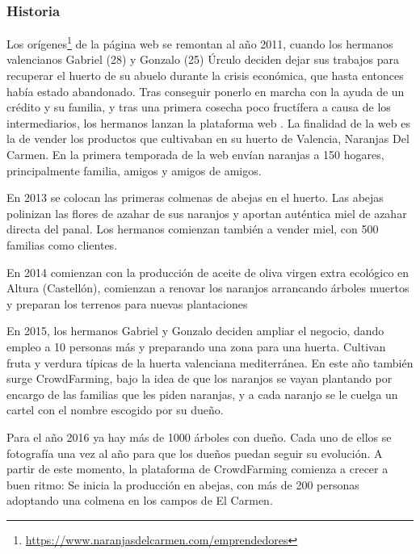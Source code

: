 
\subsubsection{Historia}

Los orígenes\footnote{\url{https://www.naranjasdelcarmen.com/emprendedores}} de la página web se remontan al año 2011, cuando los hermanos valencianos Gabriel (28) y Gonzalo (25) Úrculo deciden dejar sus trabajos para recuperar el huerto de su abuelo durante la crisis económica, que hasta entonces había estado abandonado. Tras conseguir ponerlo en marcha con la ayuda de un crédito y su familia, y tras una primera cosecha poco fructífera a causa de los intermediarios, los hermanos lanzan la plataforma web . La finalidad de la web es la de vender los productos que cultivaban en su huerto de Valencia, Naranjas Del Carmen. En la primera temporada de la web envían naranjas a 150 hogares, principalmente familia, amigos y amigos de amigos.

En 2013 se colocan las primeras colmenas de abejas en el huerto. Las abejas polinizan las flores de azahar de sus naranjos y aportan auténtica miel de azahar directa del panal. Los hermanos comienzan también a vender miel, con 500 familias como clientes.

En 2014 comienzan con la producción de aceite de oliva virgen extra ecológico en Altura (Castellón), comienzan a renovar los naranjos arrancando árboles muertos y preparan los terrenos para nuevas plantaciones

En 2015, los hermanos Gabriel y Gonzalo deciden ampliar el negocio, dando empleo a 10 personas más y preparando una zona para una huerta. Cultivan fruta y verdura típicas de la huerta valenciana mediterránea. En este año también surge CrowdFarming, bajo la idea de que los naranjos se vayan plantando por encargo de las familias que les piden naranjas, y a cada naranjo se le cuelga un cartel con el nombre escogido por su dueño.

Para el año 2016 ya hay más de 1000 árboles con dueño. Cada uno de ellos se fotografía una vez al año para que los dueños puedan seguir su evolución. A partir de este momento, la plataforma de CrowdFarming comienza a crecer a buen ritmo: Se inicia la producción en abejas, con más de 200 personas adoptando una colmena en los campos de El Carmen.

